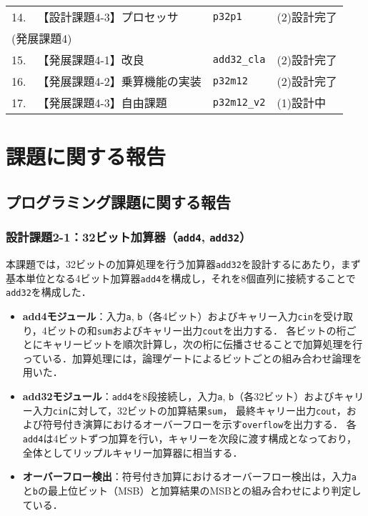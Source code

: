 \documentclass[autodetect-engine,dvi=dvipdfmx,ja=standard,
               a4j,11pt]{bxjsarticle}
\begin{document}
\begin{table}[b]
\begin{center}
{\begin{tabular}{rll|l}
    14. & 【設計課題4-3】プロセッサ      & \verb|p32p1|          & (2)設計完了 \\
    \multicolumn{3}{l|}{(発展課題4)} & \\
    15. & 【発展課題4-1】改良            & \verb|add32_cla|      & (2)設計完了 \\
    16. & 【発展課題4-2】乗算機能の実装  &  \verb|p32m12|         & (2)設計完了 \\
    17. & 【発展課題4-3】自由課題        &  \verb|p32m12_v2|      & (1)設計中 \\
    \hline
    \end{tabular}
    }
    \end{center}
    \end{table}
    \clearpage
\section{課題に関する報告}
\subsection{プログラミング課題に関する報告}
\subsubsection{設計課題2-1：32ビット加算器（\texttt{add4}, \texttt{add32}）}

本課題では，32ビットの加算処理を行う加算器\texttt{add32}を設計するにあたり，まず基本単位となる4ビット加算器\texttt{add4}を構成し，それを8個直列に接続することで\texttt{add32}を構成した．

\begin{itemize}
  \item \textbf{add4モジュール}：入力\texttt{a}, \texttt{b}（各4ビット）およびキャリー入力\texttt{cin}を受け取り，4ビットの和\texttt{sum}およびキャリー出力\texttt{cout}を出力する．
  各ビットの桁ごとにキャリービットを順次計算し，次の桁に伝播させることで加算処理を行っている．加算処理には，論理ゲートによるビットごとの組み合わせ論理を用いた．
  
  \item \textbf{add32モジュール}：\texttt{add4}を8段接続し，入力\texttt{a}, \texttt{b}（各32ビット）およびキャリー入力\texttt{cin}に対して，32ビットの加算結果\texttt{sum}，
  最終キャリー出力\texttt{cout}，および符号付き演算におけるオーバーフローを示す\texttt{overflow}を出力する．
  各\texttt{add4}は4ビットずつ加算を行い，キャリーを次段に渡す構成となっており，全体としてリップルキャリー加算器に相当する．
  
  \item \textbf{オーバーフロー検出}：符号付き加算におけるオーバーフロー検出は，入力\texttt{a}と\texttt{b}の最上位ビット（MSB）と加算結果のMSBとの組み合わせにより判定している．
\end{itemize}
\end{document}
